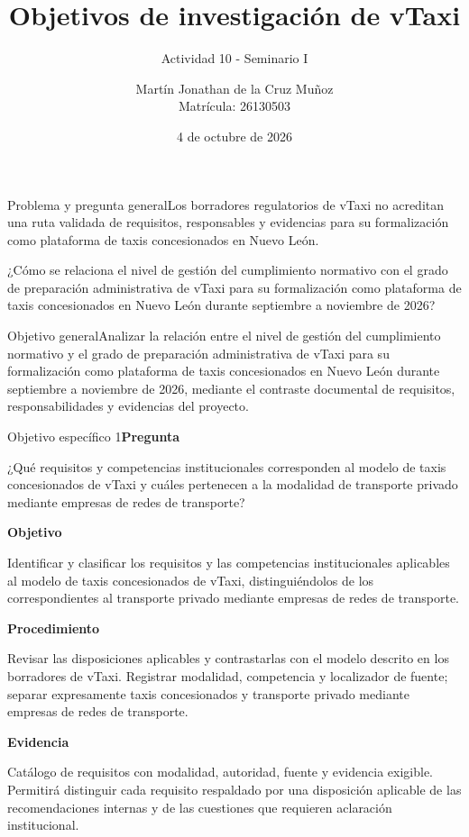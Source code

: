 \documentclass[aspectratio=169,11pt]{beamer}
\title[Objetivos de vTaxi]{Objetivos de investigación de vTaxi}
\subtitle{Actividad 10 - Seminario I}
\author[M. J. de la Cruz Muñoz]{Martín Jonathan de la Cruz Muñoz\\\small Matrícula: 26130503}
\institute[ITESCA]{Instituto Tecnológico Superior de Cajeme\\Maestría en Gestión Administrativa\\Docente: Dra. Carla Olimpya Zapuche Moreno}
\date[04/10/2026]{4 de octubre de 2026}
\begin{document}
\begin{frame}\titlepage\end{frame}
\begin{frame}{Problema y pregunta general}\small Los borradores regulatorios de vTaxi no acreditan una ruta validada de requisitos, responsables y evidencias para su formalización como plataforma de taxis concesionados en Nuevo León.\par\medskip ¿Cómo se relaciona el nivel de gestión del cumplimiento normativo con el grado de preparación administrativa de vTaxi para su formalización como plataforma de taxis concesionados en Nuevo León durante septiembre a noviembre de 2026?\end{frame}
\begin{frame}{Objetivo general}\large Analizar la relación entre el nivel de gestión del cumplimiento normativo y el grado de preparación administrativa de vTaxi para su formalización como plataforma de taxis concesionados en Nuevo León durante septiembre a noviembre de 2026, mediante el contraste documental de requisitos, responsabilidades y evidencias del proyecto.\end{frame}
\begin{frame}{Objetivo específico 1}\small\textbf{Pregunta}\par ¿Qué requisitos y competencias institucionales corresponden al modelo de taxis concesionados de vTaxi y cuáles pertenecen a la modalidad de transporte privado mediante empresas de redes de transporte?\par\medskip\textbf{Objetivo}\par Identificar y clasificar los requisitos y las competencias institucionales aplicables al modelo de taxis concesionados de vTaxi, distinguiéndolos de los correspondientes al transporte privado mediante empresas de redes de transporte.\par\medskip\textbf{Procedimiento}\par Revisar las disposiciones aplicables y contrastarlas con el modelo descrito en los borradores de vTaxi. Registrar modalidad, competencia y localizador de fuente; separar expresamente taxis concesionados y transporte privado mediante empresas de redes de transporte.\par\medskip\textbf{Evidencia}\par Catálogo de requisitos con modalidad, autoridad, fuente y evidencia exigible. Permitirá distinguir cada requisito respaldado por una disposición aplicable de las recomendaciones internas y de las cuestiones que requieren aclaración institucional.\end{frame}
\end{document}
